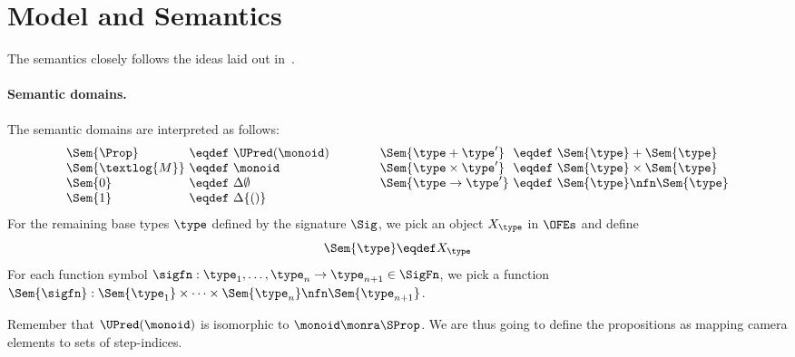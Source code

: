 \section{Model and Semantics}
\label{sec:model}

The semantics closely follows the ideas laid out in~\cite{catlogic}.

\paragraph{Semantic domains.}

The semantic  domains are interpreted as follows:
\[
\begin{array}[t]{@{}l@{\ }c@{\ }l@{}}
\Sem{\Prop} &\eqdef& \UPred(\monoid)  \\
\Sem{\textlog{M}} &\eqdef& \monoid \\
\Sem{0} &\eqdef& \Delta \emptyset \\
\Sem{1} &\eqdef& \Delta \{ () \}
\end{array}
\qquad\qquad
\begin{array}[t]{@{}l@{\ }c@{\ }l@{}}
\Sem{\type + \type'} &\eqdef& \Sem{\type} + \Sem{\type} \\
\Sem{\type \times \type'} &\eqdef& \Sem{\type} \times \Sem{\type} \\
\Sem{\type \to \type'} &\eqdef& \Sem{\type} \nfn \Sem{\type} \\
\end{array}
\]
For the remaining base types $\type$ defined by the signature $\Sig$, we pick an object $X_\type$ in $\OFEs$ and define
\[
\Sem{\type} \eqdef X_\type
\]
For each function symbol $\sigfn : \type_1, \dots, \type_n \to \type_{n+1} \in \SigFn$, we pick a function $\Sem{\sigfn} : \Sem{\type_1} \times \dots \times \Sem{\type_n} \nfn \Sem{\type_{n+1}}$.


Remember that $\UPred(\monoid)$ is isomorphic to $\monoid \monra \SProp$.
We are thus going to define the propositions as mapping camera elements to sets of step-indices.

